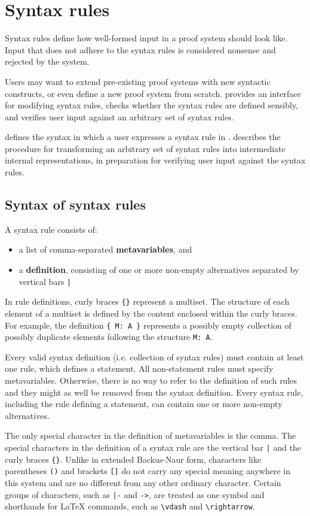 \section{Syntax rules}
\label{section:syntax}
Syntax rules define how well-formed input in a proof system should look like. Input that does not adhere to the syntax rules is considered nonsense and rejected by the system.

Users may want to extend pre-existing proof systems with new syntactic constructs, or even define a new proof system from scratch. \projectname{} provides an interface for modifying syntax rules, checks whether the syntax rules are defined sensibly, and verifies user input against an arbitrary set of syntax rules.

 defines the syntax in which a user expresses a syntax rule in \projectname{}.  describes the procedure for transforming an arbitrary set of syntax rules into intermediate internal representations, in preparation for verifying user input against the syntax rules.

\subsection{Syntax of syntax rules}
\label{syntax:syntax}
A syntax rule consists of:
\begin{itemize}
    \item a list of comma-separated \textbf{metavariables}, and
    \item a \textbf{definition}, consisting of one or more non-empty alternatives separated by vertical bars \lstinline{|}
\end{itemize}
In rule definitions, curly braces \lstinline|{}| represent a multiset. The structure of each element of a multiset is defined by the content enclosed within the curly braces. For example, the definition \lstinline|{ M: A }| represents a possibly empty collection of possibly duplicate elements following the structure \lstinline{M: A}.

Every valid syntax definition (i.e. collection of syntax rules) must contain at least one rule, which defines a statement. All non-statement rules must specify metavariables. Otherwise, there is no way to refer to the definition of such rules and they might as well be removed from the syntax definition. Every syntax rule, including the rule defining a statement, can contain one or more non-empty alternatives.

The only special character in the definition of metavariables is the comma. The special characters in the definition of a syntax rule are the vertical bar \lstinline{|} and the curly braces \lstinline|{}|. Unlike in extended Backus-Naur form, characters like parentheses \lstinline{()} and brackets \lstinline{[]} do not carry any special meaning anywhere in this system and are no different from any other ordinary character. Certain groups of characters, such as \lstinline{|-} and \lstinline{->}, are treated as one symbol and shorthands for \LaTeX{} commands, such as \lstinline{\vdash} and \lstinline{\rightarrow}.

